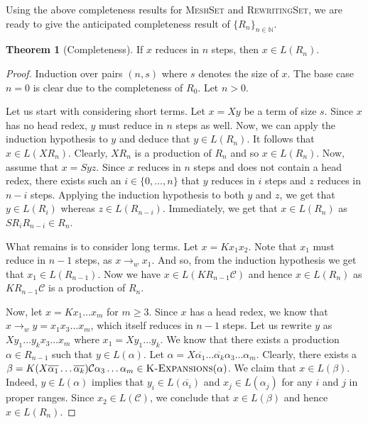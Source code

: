 \documentclass[11pt,a4paper]{amsart}
\theoremstyle{definition}
\newtheorem{theorem}{Theorem}
\newcommand{\KExpansions}[1]{\textsc{K-Expansions}(#1)}
\begin{document}
Using the above completeness results for \textsc{MeshSet} and \textsc{RewritingSet}, we are ready to give the anticipated completeness result of ${\{R_n\}}_{n \in \mathbb{N}}$.

\begin{theorem}[Completeness]\label{the-completness}
    If $x$ reduces in $n$ steps, then $x \in L(R_n)$.
\end{theorem}

\begin{proof}
    Induction over pairs $(n,s)$ where $s$ denotes the size of $x$.
    The base case $n = 0$ is clear due to the completeness of
    $R_0$. Let $n > 0$. 
    
    Let us start with considering short terms.
    Let $x = X y$ be a term of size $s$. Since $x$ has no head redex, $y$ must
    reduce in $n$ steps as well. Now, we can apply the induction hypothesis to
    $y$ and deduce that $y \in L(R_n)$. It follows that $x \in L(X R_n)$.
    Clearly, $X R_n$ is a production of $R_n$ and so $x \in L(R_n)$. Now, assume
    that $x = S y z$. Since $x$ reduces in $n$ steps and does not contain a head
    redex, there exists such an $i \in \{0,\ldots,n\}$ that $y$ reduces in $i$
    steps and $z$ reduces in $n-i$ steps. Applying the induction hypothesis to
    both $y$ and $z$, we get that $y \in L(R_i)$ whereas $z \in L(R_{n-i})$.
    Immediately, we get that $x \in L(R_n)$ as $S R_i R_{n-i} \in R_n$.
   
    What remains is to consider long terms. Let $x = K x_1 x_2$.
    Note that $x_1$ must reduce in $n-1$ steps, as $x \to_w x_1$. And so, from
    the induction hypothesis we get that $x_1 \in L(R_{n-1})$. Now we have
    $x \in L(K R_{n-1} \mathcal{C})$ and hence $x \in L(R_n)$ as $K R_{n-1}
    \mathcal{C}$ is a production of $R_n$.
    
    Now, let $x = K x_1 \ldots x_m$ for $m
    \geq 3$. Since $x$ has a head redex, we know that $x \to_w y = x_1 x_3
    \ldots x_m$, which itself reduces in $n-1$ steps. Let us rewrite $y$ as
	$X y_1 \ldots y_k x_3 \ldots x_m$ where $x_1 = X y_1 \ldots y_k$. We know that
    there exists a production $\alpha \in R_{n-1}$ such that $y \in L(\alpha)$.
    Let $\alpha = X \overline{\alpha_1} \ldots \overline{\alpha_k} \alpha_3 \ldots
    \alpha_m$. Clearly, there exists a $\beta = K (X \overline{\alpha_1} \ldots
    \overline{\alpha_k}) \mathcal{C} \alpha_3 \ldots \alpha_m \in
    \KExpansions{\alpha}$. We claim that $x \in L(\beta)$. Indeed, $y \in
    L(\alpha)$ implies that $y_i \in L(\overline{\alpha_i})$ and $x_j \in
    L(\alpha_j)$ for any $i$ and $j$ in proper ranges. Since $x_2 \in L(\mathcal{C})$, we conclude that $x \in L(\beta)$ and hence $x \in L(R_n)$.


\end{proof}
\end{document}
